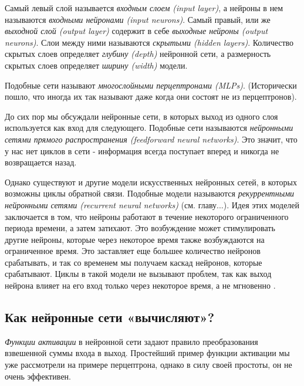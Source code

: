 Самый левый слой называется \textit{входным слоем (input layer)}, а нейроны в нем 
называются \textit{входными нейронами (input neurons)}. Самый правый, или же 
\textit{выходной слой (output layer)} содержит в себе 
\textit{выходные нейроны (output neurons)}. Слои между ними называются 
\textit{скрытыми (hidden layers)}. Количество скрытых слоев определяет 
\textit{глубину (depth)} нейронной сети, а размерность скрытых слоев 
определяет \textit{ширину (width)} модели.

Подобные сети называют \textit{многослойными перцептронами (MLPs)}. (Исторически пошло, 
что иногда их так называют даже когда они состоят не из перцептронов). 


До сих пор мы обсуждали нейронные сети, в которых выход из одного слоя используется как 
вход для следующего. Подобные сети называются \textit{нейронными сетями прямого распространения 
(feedforward neural networks)}. Это значит, что у нас нет циклов в сети - информация всегда 
поступает вперед и никогда не возвращается назад.

Однако существуют и другие модели искусственных нейронных сетей, 
в которых возможны циклы обратной связи. Подобные модели называются 
\textit{рекуррентными нейронными сетями (recurrent neural networks)} 
(см. {\color{red} главу...}). 
Идея этих моделей заключается в 
том, что нейроны работают в течение некоторого ограниченного периода 
времени, а затем затихают. Это возбуждение может стимулировать другие 
нейроны, которые через некоторое время также возбуждаются на ограниченное 
время. Это заставляет еще большее количество нейронов срабатывать, и 
так со временем мы получаем каскад нейронов, которые срабатывают. Циклы 
в такой модели не вызывают проблем, так как выход нейрона влияет на его 
вход только через некоторое время, а не мгновенно \cite{NN_Nielsen}.

\subsection{Как нейронные сети «вычисляют»?}

\textit{Функции активации} в нейронной сети задают правило преобразования 
взвешенной суммы входа в выход. Простейший пример функции активации мы уже 
рассмотрели на примере перцептрона, однако в силу своей простоты, он не очень 
эффективен. 


